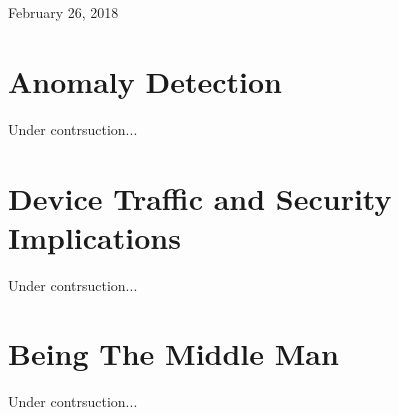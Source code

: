 \documentclass[conference]{../sty/IEEEtran}
\begin{document}
\hfill February 26, 2018

\section{Anomaly Detection}
Under contrsuction...

\section{Device Traffic and Security Implications}
Under contrsuction...

\section{Being The Middle Man}
Under contrsuction...

%
%

\end{document}
